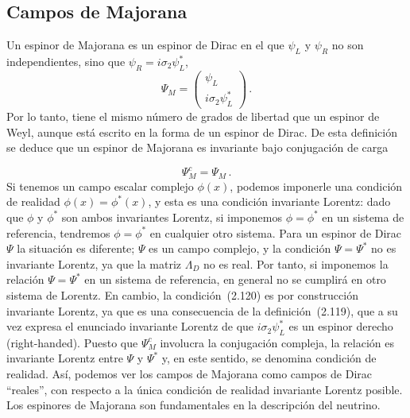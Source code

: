 \documentclass[a4paper,11pt]{book} %
\begin{document}
\subsection*{Campos de Majorana}
\noindent
Un espinor de Majorana es un espinor de Dirac en el que $\psi_{L}$ y $\psi_{R}$ no son independientes, sino que $\psi_{R}=i\sigma_{2}\psi^{*}_{L}$,
\begin{equation}
\Psi_{M}=\begin{pmatrix}\psi_{L}\\ i\sigma_{2}\psi^{*}_{L}\end{pmatrix}\,.
\end{equation}
\noindent
Por lo tanto, tiene el mismo número de grados de libertad que un espinor de Weyl, aunque
está escrito en la forma de un espinor de Dirac. 
\medskip\newline
De esta definición se deduce que
un espinor de Majorana es invariante bajo conjugación de carga

\begin{equation}
\Psi^{c}_{M}=\Psi_{M}\,.
\end{equation}
\noindent
Si tenemos un campo escalar complejo $\phi(x)$, podemos imponerle
una condición de realidad $\phi(x)=\phi^{*}(x)$, y esta es una condición
invariante Lorentz: dado que $\phi$ y $\phi^{*}$ son ambos invariantes Lorentz,
si imponemos $\phi=\phi^{*}$ en un sistema de referencia, tendremos
$\phi=\phi^{*}$ en cualquier otro sistema. Para un
espinor de Dirac $\Psi$ la situación es diferente; $\Psi$ es un campo complejo, y
la condición $\Psi=\Psi^{*}$ no es invariante Lorentz, ya que la matriz
$\Lambda_{D}$ no es real. Por tanto, si imponemos la relación
$\Psi=\Psi^{*}$ en un sistema de referencia, en general no se cumplirá en otro
sistema de Lorentz. En cambio, la condición~(2.120) es por construcción
invariante Lorentz, ya que es una consecuencia de la definición~(2.119), que a su
vez expresa el enunciado invariante Lorentz de que $i\sigma_{2}\psi^{*}_{L}$ es un espinor
derecho (right-handed). Puesto que $\Psi^{c}_{M}$ involucra la conjugación
compleja, la relación es invariante
Lorentz entre $\Psi$ y $\Psi^{*}$ y, en este sentido, se denomina condición de
realidad.
\medskip\newline
Así, podemos ver los campos de Majorana como campos de Dirac ``reales'', con
respecto a la única condición de realidad invariante Lorentz posible.
\medskip\newline
Los espinores de Majorana son fundamentales en la
descripción del neutrino. 
 
\end{document}
